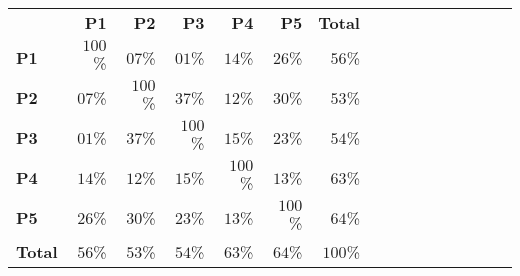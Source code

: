 \documentclass[11pt]{handout}
\begin{document}
\begin{center}
\begin{tabular}{lrrrrrrrrrrrrrrr}
& \textbf{P1}
& \textbf{P2}
& \textbf{P3}
& \textbf{P4}
& \textbf{P5}
 & \textbf{Total} \\
  \textbf{P1}
    & \color{blue!99!green!90!black} $100$\%
    & \color{blue!6!green!90!black} $07$\%
    & \color{blue!0!green!90!black} $01$\%
    & \color{blue!14!green!90!black} $14$\%
    & \color{blue!26!green!90!black} $26$\%
    & \color{blue!55!green!90!black} $56$\%
 \\
  \textbf{P2}
    & \color{blue!6!green!90!black} $07$\%
    & \color{blue!100!green!90!black} $100$\%
    & \color{blue!36!green!90!black} $37$\%
    & \color{blue!12!green!90!black} $12$\%
    & \color{blue!30!green!90!black} $30$\%
    & \color{blue!52!green!90!black} $53$\%
 \\
  \textbf{P3}
    & \color{blue!0!green!90!black} $01$\%
    & \color{blue!36!green!90!black} $37$\%
    & \color{blue!100!green!90!black} $100$\%
    & \color{blue!14!green!90!black} $15$\%
    & \color{blue!23!green!90!black} $23$\%
    & \color{blue!53!green!90!black} $54$\%
 \\
  \textbf{P4}
    & \color{blue!14!green!90!black} $14$\%
    & \color{blue!12!green!90!black} $12$\%
    & \color{blue!14!green!90!black} $15$\%
    & \color{blue!99!green!90!black} $100$\%
    & \color{blue!13!green!90!black} $13$\%
    & \color{blue!62!green!90!black} $63$\%
 \\
  \textbf{P5}
    & \color{blue!26!green!90!black} $26$\%
    & \color{blue!30!green!90!black} $30$\%
    & \color{blue!23!green!90!black} $23$\%
    & \color{blue!13!green!90!black} $13$\%
    & \color{blue!99!green!90!black} $100$\%
    & \color{blue!63!green!90!black} $64$\%
 \\
  \textbf{Total}
    & \color{blue!55!green!90!black} $56$\%
    & \color{blue!52!green!90!black} $53$\%
    & \color{blue!53!green!90!black} $54$\%
    & \color{blue!62!green!90!black} $63$\%
    & \color{blue!63!green!90!black} $64$\%
    & \color{blue!100!green!90!black} $100$\%
 \\
\end{tabular}
\end{center}
\end{document}
